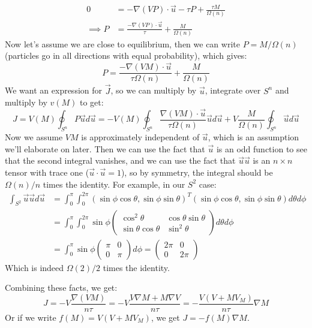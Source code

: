 \documentclass[a4paper]{jpconf}
\begin{document}
\[\begin{aligned}
    0 &= -\nabla(VP)\cdot \vec u-\tau P+\frac{\tau M}{\Omega(n)}\\
    \implies P &= \frac{-\nabla(VP)\cdot \vec u}{\tau}+\frac{M}{\Omega(n)}
\end{aligned}\]
Now let's assume we are close to equilibrium, then we can write $P = M/\Omega(n)$ (particles go in all directions with equal probability), which gives:
\[
P = \frac{-\nabla(V M)\cdot \vec u}{\tau \Omega(n)}+\frac{M}{\Omega(n)}
\]
We want an expression for $\vec J$, so we can multiply by $\vec u$, integrate over $S^n$ and multiply by $v(M)$ to get:
\[
J = V(M)\oint_{S^n}P\vec ud\vec u = -V(M)\oint_{S^n} \frac{\nabla (VM)\cdot \vec u }{\tau \Omega(n)}\vec ud\vec u +V\frac{M}{\Omega(n)}\oint_{S^n} \vec u d\vec u
\]
Now we assume $VM$ is approximately independent of $\vec u$, which is an assumption we'll elaborate on later. Then we can use the fact that $\vec u$ is an odd function to see that the second integral vanishes, and we can use the fact that $\vec u \vec u$ is an $n\times n$ tensor with trace one ($\vec u\cdot \vec u=1$), so by symmetry, the integral should be  $\Omega(n)/n$ times the identity. For example, in our $S^2$ case:
\[\begin{aligned}
\int_{S^2}\vec u\vec ud\vec u&=\int_0^\pi\int_0^{2\pi} (\sin\phi\cos \theta,\sin\phi\sin \theta)^T(\sin\phi\cos \theta,\sin\phi\sin \theta)d\theta d\phi\\
&=\int_0^\pi\int_0^{2\pi}\sin\phi \begin{pmatrix}\cos^2\theta&\cos\theta\sin\theta\\ \sin\theta\cos\theta&\sin^2\theta \end{pmatrix}d\theta d\phi\\
&=\int_{0}^\pi\sin\phi \begin{pmatrix}\pi&0\\ 0&\pi \end{pmatrix} d\phi=\begin{pmatrix}2\pi&0\\ 0&2\pi \end{pmatrix}
\end{aligned}\]
Which is indeed $\Omega(2)/2$ times the identity. 

Combining these facts, we get:
\[
J = -V\frac{\nabla(VM)}{n\tau} = -V\frac{V\nabla M+M\nabla V}{n\tau} =-\frac{V(V+MV_M)}{n\tau} \nabla M
\]
Or if we write $f(M)=V(V+MV_M)$, we get $J  = -f(M)\nabla M$. 
\end{document}
